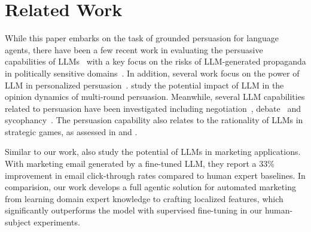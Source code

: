 \section{Related Work}
\label{sec:related}

While this paper embarks on the task of grounded persuasion for language agents, there have been a few recent work in evaluating the persuasive capabilities of LLMs~\citep{durmus2024measuring} with a key focus on the risks of LLM-generated propaganda in politically sensitive domains~\citep{voelkel2023artificial,goldstein2024persuasive, hackenburg2024evidence, luciano2024hypersuasion}. In addition, several work focus on the power of LLM in personalized persuasion~\citep{hackenburg2024evaluating,salvi2024conversational,matz2024potential}.  \citet{breum2024persuasive} study the potential impact of LLM in the opinion dynamics of multi-round persuasion. 
Meanwhile, several LLM capabilities related to persuasion have been investigated including negotiation~\citep{bianchi2024well}, debate~\citep{khan2024debating} and sycophancy~\citep{sharma2023towards, denison2024sycophancy}.  The persuasion capability also
relates to the rationality of LLMs in strategic games, 
as assessed in \citet{chen2023emergence} and \citet{ramansteer}. 

Similar to our work, \citet{angelopoulos2024value} also study the potential of LLMs in marketing applications. With marketing email generated by a fine-tuned LLM, they report a 33\% improvement in email click-through rates compared to human expert baselines. In comparision, our work develops a full agentic solution for automated marketing from learning domain expert knowledge to crafting localized features, which significantly outperforms the model with supervised fine-tuning in our human-subject experiments. 

